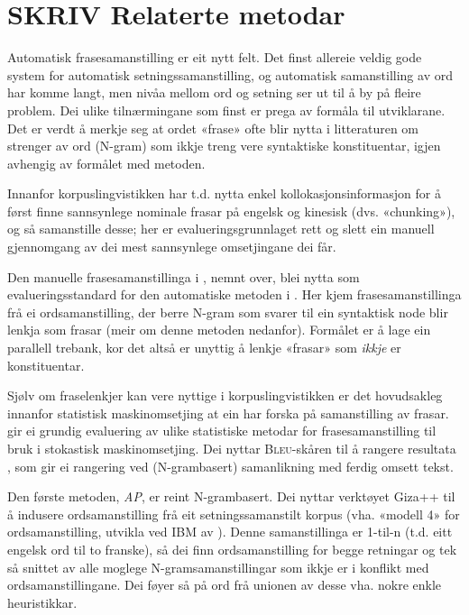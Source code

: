 \documentclass[11pt,a4paper,oneside,draft]{book}
\newcommand{\Bleu}{\textsc{Bleu}}
\begin{document}
  \label{SEC:bakgrunn}

\section{\textbf{SKRIV} Relaterte metodar}
\label{sec-2.1}

Automatisk frasesamanstilling er eit nytt felt. Det finst allereie
veldig gode system for automatisk setningssamanstilling, og automatisk
samanstilling av ord har komme langt, men nivåa mellom ord og setning
ser ut til å by på fleire problem.  Dei ulike tilnærmingane
som finst er prega av formåla til utviklarane. Det er verdt å merkje
seg at ordet «frase» ofte blir nytta i litteraturen om strenger av ord
(N-gram) som ikkje treng vere syntaktiske konstituentar, igjen
avhengig av formålet med metoden.

Innanfor korpuslingvistikken har t.d. \citet{piao2001mwu} nytta enkel
kollokasjonsinformasjon for å først finne sannsynlege nominale frasar
på engelsk og kinesisk (dvs. «chunking»), og så samanstille desse; her
er evalueringsgrunnlaget rett og slett ein manuell gjennomgang av dei
mest sannsynlege omsetjingane dei får. 

Den manuelle frasesamanstillinga i \citet{samuelsson2006pap}, nemnt
over, blei nytta som evalueringsstandard for den automatiske metoden i
\citet{samuelsson2007apa}.  Her kjem frasesamanstillinga frå ei
ordsamanstilling, der berre N-gram som svarer til ein syntaktisk node
blir lenkja som frasar (meir om denne metoden nedanfor). Formålet er å
lage ein parallell trebank, kor det altså er unyttig å lenkje «frasar»
som \emph{ikkje} er konstituentar.

Sjølv om fraselenkjer kan vere nyttige i korpuslingvistikken er det
hovudsakleg innanfor statistisk maskinomsetjing at ein har forska på
samanstilling av frasar. \citet{koehn2003spb} gir ei grundig
evaluering av ulike statistiske metodar for frasesamanstilling til
bruk i stokastisk maskinomsetjing. Dei nyttar \Bleu-skåren til å
rangere resultata
\citep[Papineni~et~al.,~2001,~i][s.~51]{koehn2003spb}, som gir ei
rangering ved (N-grambasert) samanlikning med ferdig omsett tekst.

Den første metoden, \emph{AP}, er reint N-grambasert. Dei nyttar verktøyet
Giza++ \citep[Och~og~Ney,~2000,~i][s.~50]{koehn2003spb} til å indusere
ordsamanstilling frå eit setningssamanstilt korpus (vha. «modell 4»
for ordsamanstilling, utvikla ved IBM av \citet{brown1993msm}). Denne
samanstillinga er 1-til-n (t.d. eitt engelsk ord til to franske), så
dei finn ordsamanstilling for begge retningar og tek så snittet av alle
moglege N-gramsamanstillingar som ikkje er i konflikt med
ordsamanstillingane. Dei føyer så på ord frå unionen av desse
vha. nokre enkle heuristikkar.
\end{document}
